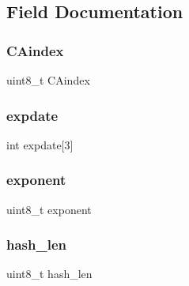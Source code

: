 \subsection{Field Documentation}
\hypertarget{struct_certification_authorities_a9414fe6ffc23bcd6aecf04b73815de4c}{}\label{struct_certification_authorities_a9414fe6ffc23bcd6aecf04b73815de4c}
\subsubsection{\texorpdfstring{C\+Aindex}{CAindex}}
{\footnotesize\ttfamily uint8\+\_\+t C\+Aindex}

\hypertarget{struct_certification_authorities_a74db2d4c720927689793d17e8f7aa201}{}\label{struct_certification_authorities_a74db2d4c720927689793d17e8f7aa201}
\subsubsection{\texorpdfstring{expdate}{expdate}}
{\footnotesize\ttfamily int expdate\mbox{[}3\mbox{]}}

\hypertarget{struct_certification_authorities_af05d5abe7656953548edfb3eb5117659}{}\label{struct_certification_authorities_af05d5abe7656953548edfb3eb5117659}
\subsubsection{\texorpdfstring{exponent}{exponent}}
{\footnotesize\ttfamily uint8\+\_\+t exponent}

\hypertarget{struct_certification_authorities_a759b7e96d51c83032b1b2b3b044c603b}{}\label{struct_certification_authorities_a759b7e96d51c83032b1b2b3b044c603b}
\subsubsection{\texorpdfstring{hash\+\_\+len}{hash\_len}}
{\footnotesize\ttfamily uint8\+\_\+t hash\+\_\+len}

